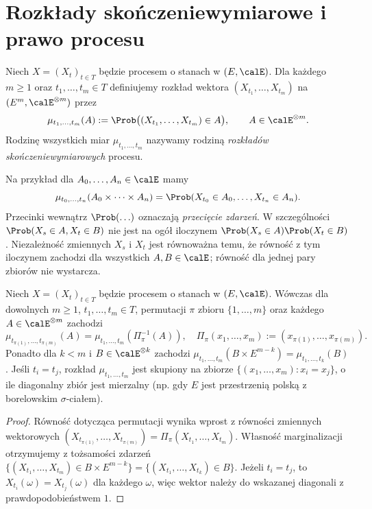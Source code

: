 \section{Rozkłady skończeniewymiarowe i prawo procesu}
\begin{definicja}
Niech $X=(X_t)_{t\in T}$ będzie procesem o stanach w $(E,\calE)$.
Dla każdego $m\ge1$ oraz $t_1,\ldots,t_m\in T$ definiujemy
rozkład wektora $(X_{t_1},\ldots,X_{t_m})$ na
$(E^m,\calE^{\otimes m})$ przez
\[
\mu_{t_1,\ldots,t_m}(A)
:=\Prob\big((X_{t_1},\ldots,X_{t_m})\in A\big),
\qquad A\in\calE^{\otimes m}.
\]
Rodzinę wszystkich miar $\mu_{t_1,\ldots,t_m}$ nazywamy rodziną
\emph{rozkładów skończeniewymiarowych} procesu.
\end{definicja}

Na przykład dla $A_0,\ldots,A_n\in\calE$ mamy
\[
\mu_{t_0,\ldots,t_n}(A_0\times\cdots\times A_n)
=\Prob(X_{t_0}\in A_0,\ldots,X_{t_n}\in A_n).
\]
Przecinki wewnątrz $\Prob(\ldots)$ oznaczają \emph{przecięcie zdarzeń}.
W szczególności $\Prob(X_s\in A,X_t\in B)$ nie jest na ogół
iloczynem $\Prob(X_s\in A)\Prob(X_t\in B)$.
Niezależność zmiennych $X_s$ i $X_t$ jest równoważna
temu, że równość z tym iloczynem zachodzi dla wszystkich
$A,B\in\calE$; równość dla jednej pary zbiorów nie wystarcza.

\begin{twierdzenie}
Niech $X=(X_t)_{t\in T}$ będzie procesem o stanach w $(E,\calE)$.
Wówczas dla dowolnych $m\ge1$, $t_1,\ldots,t_m\in T$,
permutacji $\pi$ zbioru $\{1,\ldots,m\}$ oraz każdego
$A\in\calE^{\otimes m}$ zachodzi
\[
\mu_{t_{\pi(1)},\ldots,t_{\pi(m)}}(A)
=\mu_{t_1,\ldots,t_m}(\Pi_\pi^{-1}(A)),
\quad
\Pi_\pi(x_1,\ldots,x_m):=(x_{\pi(1)},\ldots,x_{\pi(m)}).
\]
Ponadto dla $k<m$ i $B\in\calE^{\otimes k}$ zachodzi
$\mu_{t_1,\ldots,t_m}(B\times E^{m-k})=\mu_{t_1,\ldots,t_k}(B)$.
Jeśli $t_i=t_j$, rozkład $\mu_{t_1,\ldots,t_m}$ jest skupiony na
zbiorze $\{(x_1,\ldots,x_m):x_i=x_j\}$, o ile diagonalny zbiór jest mierzalny
(np. gdy $E$ jest przestrzenią polską z borelowskim $\sigma$-ciałem).
\end{twierdzenie}
\begin{proof}
Równość dotycząca permutacji wynika wprost z równości zmiennych
wektorowych
$(X_{t_{\pi(1)}},\ldots,X_{t_{\pi(m)}})
=\Pi_\pi(X_{t_1},\ldots,X_{t_m})$.
Własność marginalizacji otrzymujemy z tożsamości zdarzeń
$\{(X_{t_1},\ldots,X_{t_m})\in B\times E^{m-k}\}
=\{(X_{t_1},\ldots,X_{t_k})\in B\}$.
Jeżeli $t_i=t_j$, to $X_{t_i}(\omega)=X_{t_j}(\omega)$
dla każdego $\omega$, więc wektor należy do wskazanej diagonali
z prawdopodobieństwem $1$.
\end{proof}

